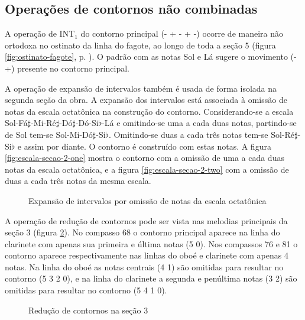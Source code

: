 \subsection{Operações de contornos não combinadas}
\label{sec:cont-nao-comb}

A operação de INT$_1$ do contorno principal (- + - + -) ocorre de
maneira não ortodoxa no ostinato da linha do fagote, ao longo de toda
a seção 5 (figura \ref{fig:ostinato-fagote},
p. \pageref{fig:ostinato-fagote}). O padrão com as notas Sol e Lá
sugere o movimento (- +) presente no contorno principal.

A operação de expansão de intervalos também é usada de forma isolada
na segunda seção da obra. A expansão dos intervalos está associada à
omissão de notas da escala octatônica na construção do
contorno. Considerando-se a escala
Sol-Fá$\sharp$-Mi-Ré$\sharp$-Dó$\sharp$-Dó-Si$\flat$-Lá e omitindo-se
uma a cada duas notas, partindo-se de Sol tem-se
Sol-Mi-Dó$\sharp$-Si$\flat$. Omitindo-se duas a cada três notas tem-se
Sol-Ré$\sharp$-Si$\flat$ e assim por diante. O contorno é construído
com estas notas. A figura \ref{fig:escala-secao-2-one} mostra o
contorno com a omissão de uma a cada duas notas da escala octatônica,
e a figura \ref{fig:escala-secao-2-two} com a omissão de duas a cada
três notas da mesma escala.

\begin{figure}
  \centering

  \caption{Expansão de intervalos por omissão de notas da escala
    octatônica}
  \label{fig:escala-secao-2}
\end{figure}

A operação de redução de contornos pode ser vista nas melodias
principais da seção 3 (figura \ref{fig:reducao-contornos-secao-3}). No
compasso 68 o contorno principal \contpr{} aparece na linha do
clarinete com apenas sua primeira e última notas (5 0). Nos compassos
76 e 81 o contorno aparece respectivamente nas linhas do oboé e
clarinete com apenas 4 notas. Na linha do oboé as notas centrais (4 1)
são omitidas para resultar no contorno (5 3 2 0), e na linha do
clarinete a segunda e penúltima notas (3 2) são omitidas para resultar
no contorno (5 4 1 0).

\begin{figure}
  \centering



  \caption{Redução de contornos na seção 3}
  \label{fig:reducao-contornos-secao-3}
\end{figure}

